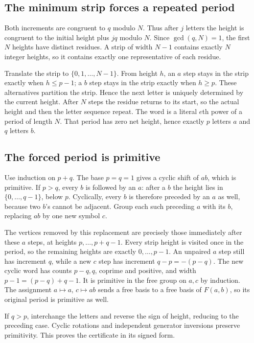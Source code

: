\documentclass[11pt,letterpaper]{article}
\theoremstyle{definition}
\theoremstyle{remark}\newtheorem{remark}[theorem]{Remark}
\begin{document}
\subsection{The minimum strip forces a repeated period}

Both increments are congruent to $q$ modulo $N$. Thus after $j$ letters the
height is congruent to the initial height plus $jq$ modulo $N$. Since
$\gcd(q,N)=1$, the first $N$ heights have distinct residues. A strip of width
$N-1$ contains exactly $N$ integer heights, so it contains exactly one
representative of each residue.

Translate the strip to $\{0,1,\ldots,N-1\}$. From height $h$, an $a$ step
stays in the strip exactly when $h\le p-1$; a $b$ step stays in the strip
exactly when $h\ge p$. These alternatives partition the strip. Hence the
next letter is uniquely determined by the current height. After $N$ steps
the residue returns to its start, so the actual height and then the letter
sequence repeat. The word is a literal $e$th power of a period of length $N$.
That period has zero net height, hence exactly $p$ letters $a$ and $q$
letters $b$.

\subsection{The forced period is primitive}

Use induction on $p+q$. The base $p=q=1$ gives a cyclic shift of $ab$,
which is primitive. If $p>q$, every $b$ is followed by an $a$: after a $b$
the height lies in $\{0,\ldots,q-1\}$, below $p$. Cyclically, every $b$
is therefore preceded by an $a$ as well, because two $b$'s cannot be
adjacent. Group each such preceding $a$ with its $b$, replacing $ab$ by
one new symbol $c$.

The vertices removed by this replacement are precisely those immediately
after these $a$ steps, at heights $p,\ldots,p+q-1$. Every strip height is
visited once in the period, so the remaining heights are exactly
$0,\ldots,p-1$. An unpaired $a$ step still has increment $q$, while a new
$c$ step has increment $q-p=-(p-q)$. The new cyclic word has counts
$p-q,q$, coprime and positive, and width
$p-1=(p-q)+q-1$. It is primitive in the free group on $a,c$ by induction.
The assignment $a\mapsto a$, $c\mapsto ab$ sends a free basis to a free
basis of $F(a,b)$, so its original period is primitive as well.

If $q>p$, interchange the letters and reverse the sign of height, reducing
to the preceding case. Cyclic rotations and independent generator inversions
preserve primitivity. This proves the certificate in its signed form.
\end{document}
